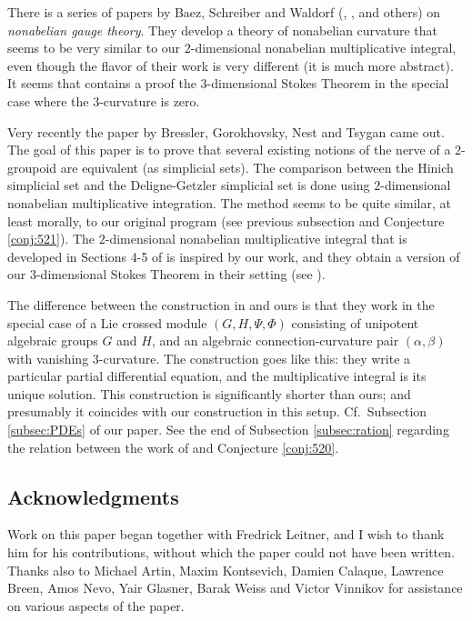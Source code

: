 \documentclass[10pt, a4paper]{amsart}
\theoremstyle{definition}
\numberwithin{equation}{section}
\begin{document}
There is a series of papers by Baez, Schreiber and Waldorf (\cite{BS},
\cite{SW1}, \cite{SW2} and others) on {\em nonabelian gauge theory}. They
develop a theory of nonabelian curvature that seems to be very similar to our 
$2$-dimensional nonabelian multiplicative integral, even though the flavor of
their work is very different (it is much more abstract). It seems that
\cite{SW2} contains a proof the $3$-dimensional Stokes Theorem in the special
case where the $3$-curvature is zero. 

Very recently the paper \cite{BGNT} by Bressler, Gorokhovsky, Nest and Tsygan
came out. The goal of this paper is to prove that several existing notions of
the nerve of a $2$-groupoid are equivalent (as simplicial sets). 
The comparison between the Hinich simplicial set and the Deligne-Getzler
simplicial set is done using  $2$-dimensional nonabelian multiplicative
integration. The method seems to be quite similar, at least morally, to our
original program (see previous subsection and Conjecture \ref{conj:521}). 
The $2$-dimensional nonabelian multiplicative integral that is developed in
Sections 4-5 of \cite{BGNT} is inspired by our work, and they obtain 
a version of our $3$-dimensional Stokes Theorem in their setting (see 
\cite[Theorems 5.1 and 5.2]{BGNT}). 

The difference between the construction in \cite{BGNT} and ours is that they
work in the special case of a Lie crossed module  $(G, H, \Psi, \Phi)$
consisting of unipotent algebraic groups $G$ and $H$, and an algebraic
connection-curvature pair $(\alpha, \beta)$ with vanishing $3$-curvature. The
construction goes like this: they write a particular partial differential
equation, and the multiplicative integral is its unique
solution. This construction is significantly shorter than ours; 
and presumably it coincides with our construction in this setup. 
Cf.\ Subsection \ref{subsec:PDEs} of our paper. 
See the end of Subsection \ref{subsec:ration} regarding the relation between
the work of \cite{BGNT} and Conjecture \ref{conj:520}.  



\medskip \noindent
\subsection{Acknowledgments}
Work on this paper began together with Fredrick Leitner, and I wish to
thank him for his contributions, without which the paper could not
have been written. Thanks also to Michael Artin, Maxim Kontsevich, 
Damien Calaque, Lawrence Breen, Amos Nevo, Yair Glasner, Barak Weiss and Victor
Vinnikov for assistance on various aspects of the paper. 
\end{document}
